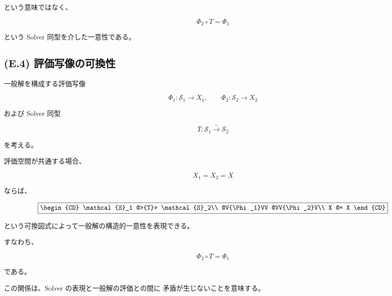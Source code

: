 \documentclass[a4paper,11pt]{article}
\newcommand{\Solver}{\mathcal{S}}
\begin{document}
という意味ではなく、

\begin{equation}
    \boxed{
        \Phi_2\circ T=\Phi_1
    }
\end{equation}

という Solver 同型を介した一意性である。


\subsection{(E.4) 評価写像の可換性}
\label{subsec:E4}

一般解を構成する評価写像

\begin{equation}
    \Phi_1:
    \Solver_1\to X_1,
    \qquad
    \Phi_2:
    \Solver_2\to X_2
\end{equation}

および Solver 同型

\begin{equation}
    T:
    \Solver_1
    \overset{\sim}{\longrightarrow}
    \Solver_2
\end{equation}

を考える。

評価空間が共通する場合、

\begin{equation}
    X_1=X_2=X
\end{equation}

ならば、

\begin{equation}
    \boxed{
        \begin{CD}
            \Solver_1 @>{T}>> \Solver_2\\
            @V{\Phi_1}VV @VV{\Phi_2}V\\
            X @= X
        \end{CD}
    }
    \label{eq:E-commutative-diagram}
\end{equation}

という可換図式によって一般解の構造的一意性を表現できる。

すなわち、

\begin{equation}
    \Phi_2\circ T
    =
    \Phi_1
\end{equation}

である。

この関係は、Solver の表現と一般解の評価との間に
矛盾が生じないことを意味する。


\end{document}
